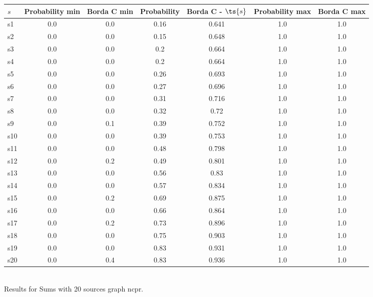 \documentclass{article}
\begin{document}
\noindent\begin{tabular}{|l|c|c|c|c|c|c|}
\hline
$s$& Probability min & Borda C min & Probability & Borda C - $\ts{s}$ & Probability max & Borda C max\\
\hline
s1 &0.0 & 0.0 & 0.16 & 0.641 & 1.0 & 1.0\\
\hline
s2 &0.0 & 0.0 & 0.15 & 0.648 & 1.0 & 1.0\\
\hline
s3 &0.0 & 0.0 & 0.2 & 0.664 & 1.0 & 1.0\\
\hline
s4 &0.0 & 0.0 & 0.2 & 0.664 & 1.0 & 1.0\\
\hline
s5 &0.0 & 0.0 & 0.26 & 0.693 & 1.0 & 1.0\\
\hline
s6 &0.0 & 0.0 & 0.27 & 0.696 & 1.0 & 1.0\\
\hline
s7 &0.0 & 0.0 & 0.31 & 0.716 & 1.0 & 1.0\\
\hline
s8 &0.0 & 0.0 & 0.32 & 0.72 & 1.0 & 1.0\\
\hline
s9 &0.0 & 0.1 & 0.39 & 0.752 & 1.0 & 1.0\\
\hline
s10 &0.0 & 0.0 & 0.39 & 0.753 & 1.0 & 1.0\\
\hline
s11 &0.0 & 0.0 & 0.48 & 0.798 & 1.0 & 1.0\\
\hline
s12 &0.0 & 0.2 & 0.49 & 0.801 & 1.0 & 1.0\\
\hline
s13 &0.0 & 0.0 & 0.56 & 0.83 & 1.0 & 1.0\\
\hline
s14 &0.0 & 0.0 & 0.57 & 0.834 & 1.0 & 1.0\\
\hline
s15 &0.0 & 0.2 & 0.69 & 0.875 & 1.0 & 1.0\\
\hline
s16 &0.0 & 0.0 & 0.66 & 0.864 & 1.0 & 1.0\\
\hline
s17 &0.0 & 0.2 & 0.73 & 0.896 & 1.0 & 1.0\\
\hline
s18 &0.0 & 0.0 & 0.75 & 0.903 & 1.0 & 1.0\\
\hline
s19 &0.0 & 0.0 & 0.83 & 0.931 & 1.0 & 1.0\\
\hline
s20 &0.0 & 0.4 & 0.83 & 0.936 & 1.0 & 1.0\\
\hline
\end{tabular}\\

\noindent Results for Sums with 20 sources graph ncpr.
\end{document}
